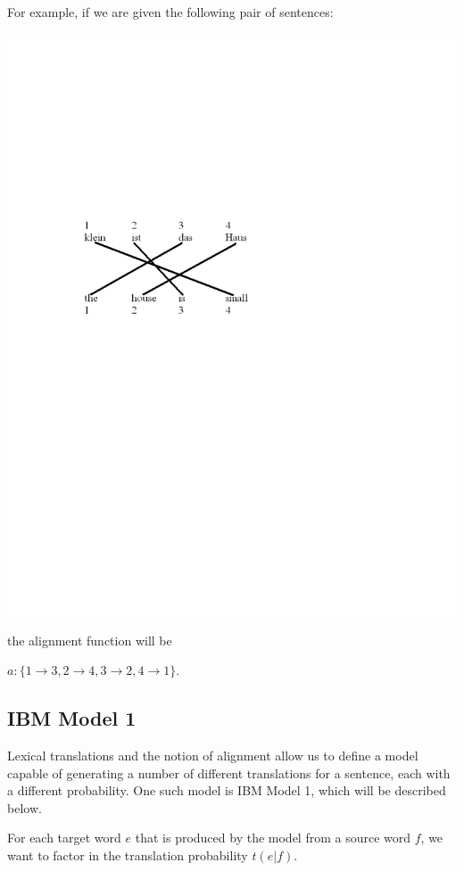 \documentclass[10pt]{report}
\theoremstyle{plain}
\begin{document}
{For example, if we are given the following pair of sentences:

\includegraphics[viewport = 100 400 400 550,clip]{constantin-figure2.pdf}

the alignment function will be

$a:\{1 \rightarrow 3, 2 \rightarrow 4, 3 \rightarrow 2, 4
\rightarrow 1\}$.


\subsection{IBM Model 1\\}

Lexical translations and the notion of alignment allow us to define
a model capable of generating a number of different translations for
a sentence, each with a different probability. One such model is IBM
Model 1, which will be described below.

For each target word $e$ that is produced by the model from a source
word $f$, we want to factor in the translation probability $t(e|f)$.

}
\end{document}
